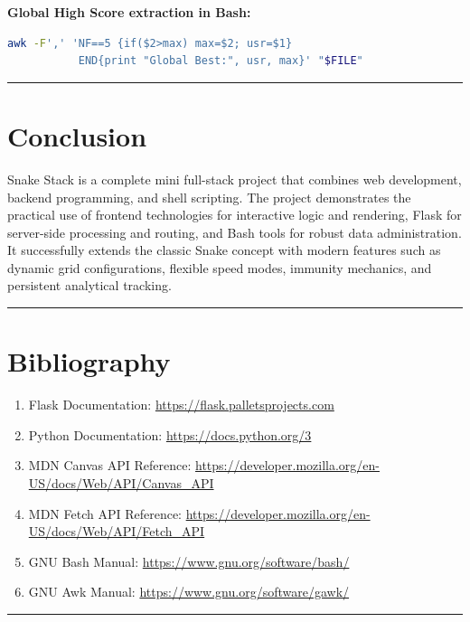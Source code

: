\documentclass[12pt,a4paper]{article}
\newcommand{\sectionsep}{
    \vspace{1.5em}
    \noindent\rule{\textwidth}{0.8pt}
    \vspace{1.5em}
}
\begin{document}
\noindent\begin{minipage}{\linewidth}
\textbf{Global High Score extraction in Bash:}
\begin{lstlisting}[language=bash]
awk -F',' 'NF==5 {if($2>max) max=$2; usr=$1}
           END{print "Global Best:", usr, max}' "$FILE"
\end{lstlisting}
\end{minipage}
\vspace{1em}

\sectionsep

\section{Conclusion}

Snake Stack is a complete mini full-stack project that combines web development, backend programming, and shell scripting. The project demonstrates the practical use of frontend technologies for interactive logic and rendering, Flask for server-side processing and routing, and Bash tools for robust data administration. It successfully extends the classic Snake concept with modern features such as dynamic grid configurations, flexible speed modes, immunity mechanics, and persistent analytical tracking.

\sectionsep

\section{Bibliography}

\begin{enumerate}
    \item Flask Documentation: \url{https://flask.palletsprojects.com}
    \item Python Documentation: \url{https://docs.python.org/3}
    \item MDN Canvas API Reference: \url{https://developer.mozilla.org/en-US/docs/Web/API/Canvas_API}
    \item MDN Fetch API Reference: \url{https://developer.mozilla.org/en-US/docs/Web/API/Fetch_API}
    \item GNU Bash Manual: \url{https://www.gnu.org/software/bash/}
    \item GNU Awk Manual: \url{https://www.gnu.org/software/gawk/}
\end{enumerate}

\sectionsep

\end{document}
